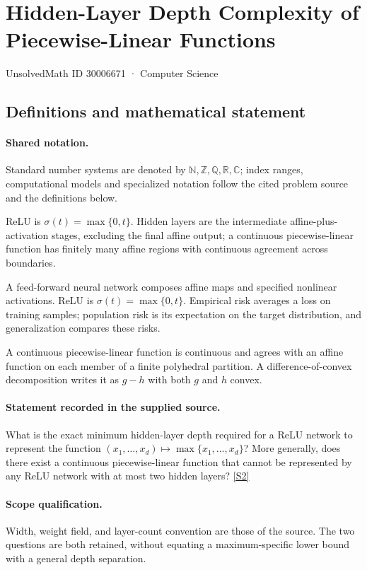 \documentclass[11pt]{article}
\newcommand{\sref}[2]{\hyperlink{source:#1:#2}{[S#2]}}
\begin{document}
\setcounter{section}{30006670}
\section{Hidden-Layer Depth Complexity of Piecewise-Linear Functions}\label{30006671}
{\small\sffamily UnsolvedMath ID 30006671 · Computer Science}
\subsection{Definitions and mathematical statement}

\paragraph{Shared notation.}Standard number systems are denoted by $\mathbb N,\mathbb Z,\mathbb Q,\mathbb R,\mathbb C$; index ranges, computational models and specialized notation follow the cited problem source and the definitions below.


ReLU is $\sigma(t)=\max\{0,t\}$. Hidden layers are the intermediate affine-plus-activation stages, excluding the final affine output; a continuous piecewise-linear function has finitely many affine regions with continuous agreement across boundaries.

A feed-forward neural network composes affine maps and specified nonlinear activations. ReLU is $\sigma(t)=\max\{0,t\}$. Empirical risk averages a loss on training samples; population risk is its expectation on the target distribution, and generalization compares these risks.

A continuous piecewise-linear function is continuous and agrees with an affine function on each member of a finite polyhedral partition. A difference-of-convex decomposition writes it as $g-h$ with both $g$ and $h$ convex.
\paragraph{Statement recorded in the supplied source.}
What is the exact minimum hidden-layer depth required for a ReLU network to represent the function $(x_1,\ldots,x_d)\mapsto\max\{x_1,\ldots,x_d\}$? More generally, does there exist a continuous piecewise-linear function that cannot be represented by any ReLU network with at most two hidden layers? \sref{30006671}{2}
\paragraph{Scope qualification.}
Width, weight field, and layer-count convention are those of the source. The two questions are both retained, without equating a maximum-specific lower bound with a general depth separation.
\end{document}
